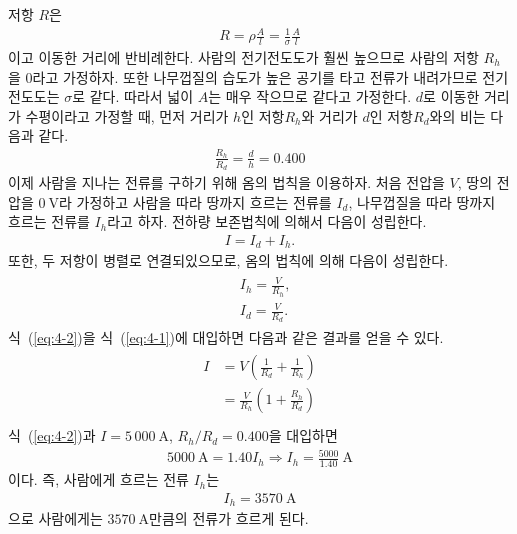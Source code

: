 \documentclass[tightenlines,floatfix,nofootinbib,superscriptaddress,fleqn]{revtex4-2}
\begin{document}
저항 $R$은
\begin{align}
  R=\rho\frac{A}{l}=\frac{1}{\sigma}\frac{A}{l}
\end{align}
이고 이동한 거리에 반비례한다.
사람의 전기전도도가 훨씬 높으므로 사람의 저항 $R_{h}$을 $0$라고 가정하자. 
또한 나무껍질의 습도가 높은 공기를 타고 전류가 내려가므로 전기전도도는
$\sigma$로 같다. 따라서  넓이 $A$는 매우 작으므로 같다고 가정한다.
$d$로 이동한 거리가 수평이라고 가정할 때, 먼저 거리가 $h$인 저항$R_h$와
거리가 $d$인 저항$R_d$와의 비는 다음과 같다.
\begin{align}
  \frac{R_h}{R_d}=\frac{d}{h}=0.400
\end{align}
이제 사람을 지나는 전류를 구하기 위해 옴의 법칙을 이용하자. 처음 전압을
$V$, 땅의 전압을 $0~\mathrm{V}$라 가정하고 사람을 따라 땅까지
흐르는 전류를 $I_d$, 나무껍질을 따라 땅까지 흐르는 전류를 $I_h$라고 하자.
전하량 보존법칙에 의해서 다음이 성립한다.
\begin{align}
  I=I_d+I_h.
  \label{eq:4-1}
\end{align}
또한, 두 저항이 병렬로 연결되있으모로, 옴의 법칙에 의해 다음이 성립한다.
\begin{align}
  \begin{split}
   &I_h=\frac{V}{R_h},\\
   &I_d=\frac{V}{R_d}.
   \label{eq:4-2}
  \end{split}
\end{align}
식~(\ref{eq:4-2})을 식~(\ref{eq:4-1})에 대입하면 다음과 같은 결과를 
얻을 수 있다.
\begin{align}
  \begin{split}
   I&=V\left(\frac{1}{R_d}+\frac{1}{R_h}\right)\\
   &=\frac{V}{R_h}\left(1+\frac{R_h}{R_d}\right)\\
  \end{split}
\end{align}
식~(\ref{eq:4-2})과 $I=5\,000~\mathrm{A}$, ${R_h}/{R_d}=0.400$을 대입하면
\begin{align}
   5000~\mathrm{A}=1.40I_h\Longrightarrow
   I_h=\frac{5000}{1.40}~\mathrm{A}
\end{align}
이다. 즉, 사람에게 흐르는 전류 $I_h$는
\begin{align}
  I_h = 3570~\mathrm{A}
\end{align}
으로 사람에게는 $3570~\mathrm{A}$만큼의 전류가 흐르게 된다.
\end{document}
